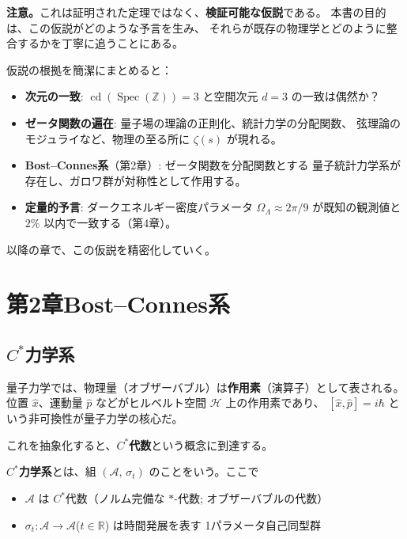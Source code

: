\documentclass[11pt,a4paper]{article}
\theoremstyle{definition}
\newcommand{\Z}{\mathbb{Z}}
\newcommand{\R}{\mathbb{R}}
\newcommand{\Spec}{\operatorname{Spec}}
\newcommand{\cd}{\operatorname{cd}}
\begin{document}
\noindent\textbf{注意。}これは証明された定理ではなく、\textbf{検証可能な仮説}である。
本書の目的は、この仮説がどのような予言を生み、
それらが既存の物理学とどのように整合するかを丁寧に追うことにある。

仮説の根拠を簡潔にまとめると：
\begin{itemize}
  \item \textbf{次元の一致}: $\cd(\Spec(\Z))=3$ と空間次元 $d=3$ の一致は偶然か？
  \item \textbf{ゼータ関数の遍在}: 量子場の理論の正則化、統計力学の分配関数、
        弦理論のモジュライなど、物理の至る所に $\zeta(s)$ が現れる。
  \item \textbf{Bost--Connes系}（第2章）: ゼータ関数を分配関数とする
        量子統計力学系が存在し、ガロワ群が対称性として作用する。
  \item \textbf{定量的予言}: ダークエネルギー密度パラメータ $\Omega_\Lambda \approx 2\pi/9$
        が既知の観測値と $2\%$ 以内で一致する（第4章）。
\end{itemize}

以降の章で、この仮説を精密化していく。

\chapter*{第2章\quad Bost--Connes系}
\setcounter{section}{0}
\renewcommand{\thesection}{2.\arabic{section}}

\section{$C^*$力学系}
\label{sec:2.1}

量子力学では、物理量（オブザーバブル）は\textbf{作用素}（演算子）として表される。
位置 $\hat{x}$、運動量 $\hat{p}$ などがヒルベルト空間 $\mathcal{H}$ 上の作用素であり、
$[\hat{x}, \hat{p}] = i\hbar$ という非可換性が量子力学の核心だ。

これを抽象化すると、$C^*$\textbf{代数}という概念に到達する。

\begin{dfnbox}[定義: $C^*$力学系]
$C^*$\textbf{力学系}とは、組 $(\mathcal{A},\, \sigma_t)$ のことをいう。ここで
\begin{itemize}
  \item $\mathcal{A}$ は $C^*$代数（ノルム完備な $*$-代数; オブザーバブルの代数）
  \item $\sigma_t: \mathcal{A}\to\mathcal{A}$\;($t\in\R$) は時間発展を表す
        1パラメータ自己同型群
\end{itemize}
\end{dfnbox}
\end{document}
